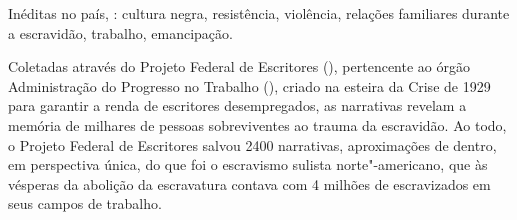 \hspace*{-7cm}\hrulefill\hspace*{-7cm}

\medskip

\noindent{}Inéditas no país, : cultura negra, resistência, violência, relações familiares durante a escravidão, trabalho, emancipação.

Coletadas através do Projeto Federal de Escritores (), pertencente ao órgão Administração do Progresso no Trabalho (), criado na esteira da Crise de 1929 para garantir a renda de escritores desempregados, as narrativas revelam a memória de milhares de pessoas sobreviventes ao trauma da escravidão. Ao todo, o Projeto Federal de Escritores salvou 2400 narrativas, aproximações de dentro, em perspectiva única, do que foi o escravismo sulista norte"-americano, que às vésperas da abolição da escravatura contava com 4 milhões de escravizados em seus campos de trabalho.

\vfill

\hspace*{-.4cm}\begin{minipage}[c]{1\linewidth}
\small{
{}}
\end{minipage}


